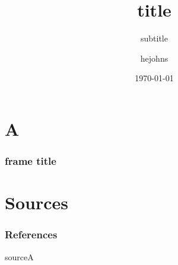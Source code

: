 \documentclass[aspectratio=169]{beamer}
\begin{document}
\beamertemplatenavigationsymbolsempty
{}
\title[short title]{title}
\subtitle{subtitle}
\author{hejohns}
\date{\today}
\begin{frame}
    \titlepage
\end{frame}
\section{A}
\begin{frame}
    \frametitle{frame title}
\end{frame}
\section{Sources}
\begin{frame}[allowframebreaks]
    \frametitle{References}
    \begin{thebibliography}{00}
        sourceA
    \end{thebibliography}
\end{frame}
\end{document}
